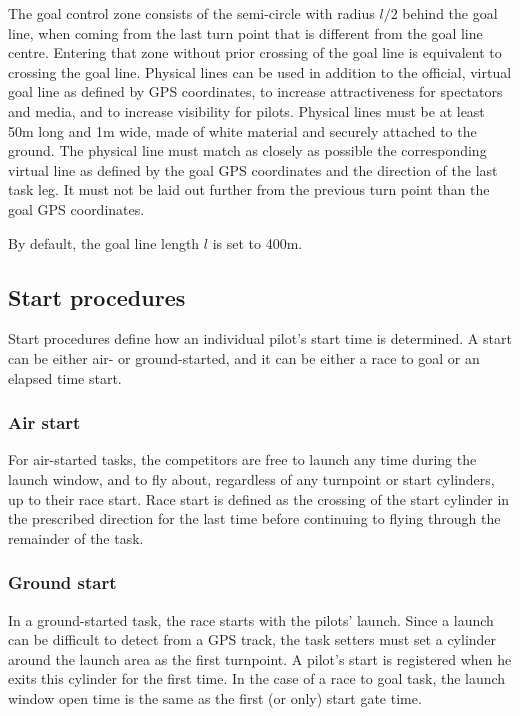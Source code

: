 \documentclass{article}
\begin{document}
The goal control zone consists of the semi-circle with radius \(l/2\) behind
the goal line, when coming from the last turn point that is different from the
goal line centre. Entering that zone without prior crossing of the goal line is
equivalent to crossing the goal line.  Physical lines can be used in addition
to the official, virtual goal line as defined by GPS coordinates, to increase
attractiveness for spectators and media, and to increase visibility for pilots.
Physical lines must be at least 50m long and 1m wide, made of white material
and securely attached to the ground. The physical line must match as closely as
possible the corresponding virtual line as defined by the goal GPS coordinates
and the direction of the last task leg. It must not be laid out further from
the previous turn point than the goal GPS coordinates.

By default, the goal line length \(l\) is set to 400m.

\subsection{Start procedures}
Start procedures define how an individual pilot’s start time is determined.
A start can be either air- or ground-started, and it can be either a race to
goal or an elapsed time start.

\subsubsection{Air start}
For air-started tasks, the competitors are free to launch any time during the
launch window, and to fly about, regardless of any turnpoint or start
cylinders, up to their race start. Race start is defined as the crossing of the
start cylinder in the prescribed direction for the last time before continuing
to flying through the remainder of the task.

\subsubsection{Ground start}
In a ground-started task, the race starts with the pilots’ launch. Since
a launch can be difficult to detect from a GPS track, the task setters must set
a cylinder around the launch area as the first turnpoint. A pilot’s start is
registered when he exits this cylinder for the first time. In the case of
a race to goal task, the launch window open time is the same as the first (or
only) start gate time.
\end{document}
